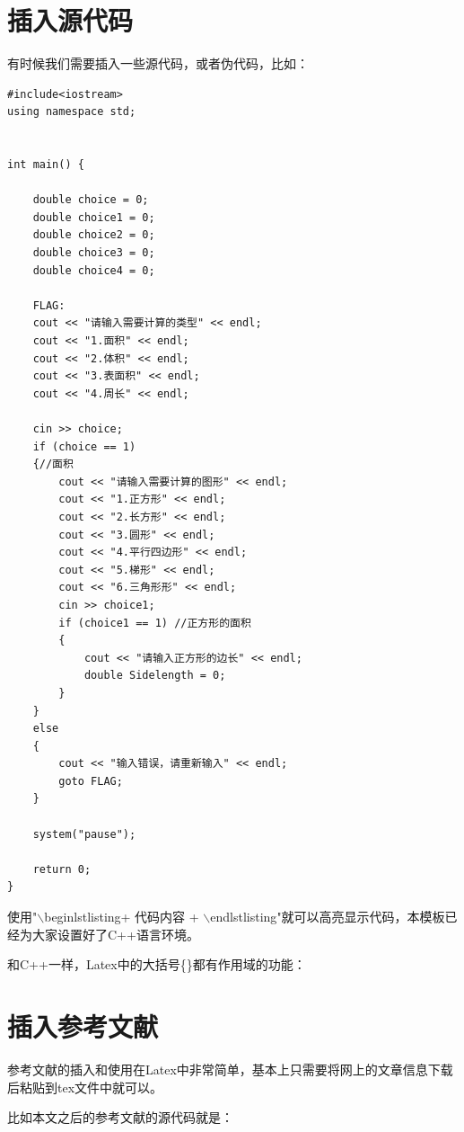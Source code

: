 \documentclass[a4paper, 10pt]{dselReport}
\begin{document}
\section{插入源代码}
有时候我们需要插入一些源代码，或者伪代码，比如：
\begin{lstlisting}
#include<iostream>
using namespace std;
 
 
int main() {
 
    double choice = 0;
    double choice1 = 0;
    double choice2 = 0;
    double choice3 = 0;
    double choice4 = 0;
     
    FLAG:
    cout << "请输入需要计算的类型" << endl;
    cout << "1.面积" << endl;
    cout << "2.体积" << endl;
    cout << "3.表面积" << endl;
    cout << "4.周长" << endl;
 
    cin >> choice;
    if (choice == 1)
    {//面积
        cout << "请输入需要计算的图形" << endl;
        cout << "1.正方形" << endl;
        cout << "2.长方形" << endl;
        cout << "3.圆形" << endl;
        cout << "4.平行四边形" << endl;
        cout << "5.梯形" << endl;
        cout << "6.三角形形" << endl;
        cin >> choice1;
        if (choice1 == 1) //正方形的面积
        {
            cout << "请输入正方形的边长" << endl;
            double Sidelength = 0;
        }
    }
    else
    {
        cout << "输入错误，请重新输入" << endl;
        goto FLAG;
    }
 
    system("pause");
 
    return 0;
}
\end{lstlisting}


使用"$\backslash$begin{lstlisting}+ 代码内容 + $\backslash$end{lstlisting}"就可以高亮显示代码，本模板已经为大家设置好了C++语言环境。


和C++一样，Latex中的大括号\{\}都有作用域的功能：

{\erhao\kai{\color{red}{You Are Welcome！}}}






\section{插入参考文献}
参考文献的插入和使用在Latex中非常简单，基本上只需要将网上的文章信息下载后粘贴到tex文件中就可以。

比如本文之后的参考文献的源代码就是：
\end{document}
